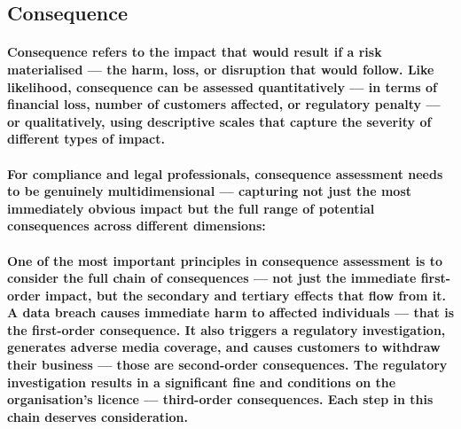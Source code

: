 \subsection{Consequence}
\paragraph{\textbf{Consequence} refers to the impact that would result if a risk materialised — the harm, loss, or disruption that would follow. Like likelihood, consequence can be assessed quantitatively — in terms of financial loss, number of customers affected, or regulatory penalty — or qualitatively, using descriptive scales that capture the severity of different types of impact.}
\paragraph{For compliance and legal professionals, consequence assessment needs to be genuinely multidimensional — capturing not just the most immediately obvious impact but the full range of potential consequences across different dimensions:}
\begin{itemize}
\end{itemize}
\paragraph{One of the most important principles in consequence assessment is to consider the \textbf{full chain of consequences} — not just the immediate first-order impact, but the secondary and tertiary effects that flow from it. A data breach causes immediate harm to affected individuals — that is the first-order consequence. It also triggers a regulatory investigation, generates adverse media coverage, and causes customers to withdraw their business — those are second-order consequences. The regulatory investigation results in a significant fine and conditions on the organisation's licence — third-order consequences. Each step in this chain deserves consideration.}

